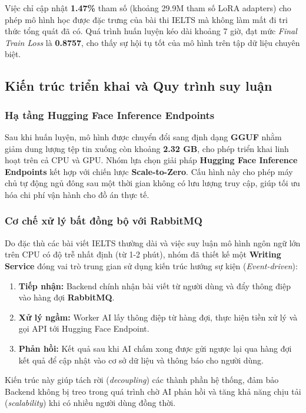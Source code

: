 Việc chỉ cập nhật \textbf{1.47\%} tham số (khoảng 29.9M tham số LoRA adapters) cho phép mô hình học được đặc trưng của bài thi IELTS mà không làm mất đi tri thức tổng quát đã có. Quá trình huấn luyện kéo dài khoảng 7 giờ, đạt mức \textit{Final Train Loss} là \textbf{0.8757}, cho thấy sự hội tụ tốt của mô hình trên tập dữ liệu chuyên biệt.

\subsection{Kiến trúc triển khai và Quy trình suy luận}

\subsubsection{Hạ tầng Hugging Face Inference Endpoints}
Sau khi huấn luyện, mô hình được chuyển đổi sang định dạng \textbf{GGUF} nhằm giảm dung lượng tệp tin xuống còn khoảng \textbf{2.32 GB}, cho phép triển khai linh hoạt trên cả CPU và GPU. Nhóm lựa chọn giải pháp \textbf{Hugging Face Inference Endpoints} kết hợp với chiến lược \textbf{Scale-to-Zero}. Cấu hình này cho phép máy chủ tự động ngủ đông sau một thời gian không có lưu lượng truy cập, giúp tối ưu hóa chi phí vận hành cho đồ án thực tế.

\subsubsection{Cơ chế xử lý bất đồng bộ với RabbitMQ}
Do đặc thù các bài viết IELTS thường dài và việc suy luận mô hình ngôn ngữ lớn trên CPU có độ trễ nhất định (từ 1-2 phút), nhóm đã thiết kế một \textbf{Writing Service} đóng vai trò trung gian sử dụng kiến trúc hướng sự kiện (\textit{Event-driven}):
\begin{enumerate}
    \item \textbf{Tiếp nhận:} Backend chính nhận bài viết từ người dùng và đẩy thông điệp vào hàng đợi \textbf{RabbitMQ}.
    \item \textbf{Xử lý ngầm:} Worker AI lấy thông điệp từ hàng đợi, thực hiện tiền xử lý và gọi API tới Hugging Face Endpoint.
    \item \textbf{Phản hồi:} Kết quả sau khi AI chấm xong được gửi ngược lại qua hàng đợi kết quả để cập nhật vào cơ sở dữ liệu và thông báo cho người dùng.
\end{enumerate}
Kiến trúc này giúp tách rời (\textit{decoupling}) các thành phần hệ thống, đảm bảo Backend không bị treo trong quá trình chờ AI phản hồi và tăng khả năng chịu tải (\textit{scalability}) khi có nhiều người dùng đồng thời.

